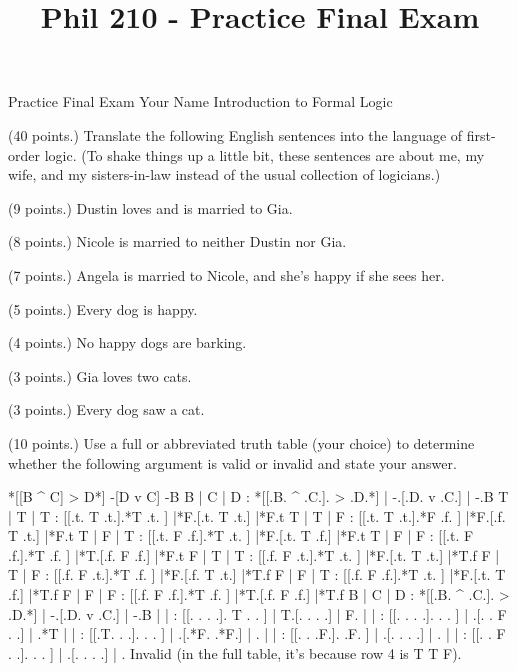 
\title{Phil 210 - Practice Final Exam}

\heading
Practice Final Exam
Your Name
Introduction to Formal Logic
\endheading

(40 points.) Translate the following English sentences into the language of first-order logic. (To shake things up a little bit, these sentences are about me, my wife, and my sisters-in-law instead of the usual collection of logicians.)

\quantifiers
\problems
{} (9 points.)
Dustin loves and is married to Gia.
	\answer
	$ $
	\endanswer

 (8 points.)
Nicole is married to neither Dustin nor Gia.
	\answer
	$ $
	\endanswer

 (7 points.)
Angela is married to Nicole, and she's happy if she sees her.
	\answer
	$ $
	\endanswer

 (5 points.)
Every dog is happy.
	\answer
	$ $
	\endanswer

 (4 points.)
No happy dogs are barking.
	\answer
	$ $
	\endanswer

 (3 points.)
Gia loves two cats.
	\answer
	$ $
	\endanswer

 (3 points.)
Every dog saw a cat.
	\answer
	$ $
	\endanswer

\endproblems

(10 points.) Use a full or abbreviated truth table (your choice) to determine whether the following argument is valid or invalid and state your answer.

\problems
{}
\argument
 *[[B ^ C] > D*]
 -[D v C]
\argumentline
 -B
\endargument
	\answer
	\truthtable
	 B | C | D : *[[.B. ^ .C.]. > .D.*] | -.[.D. v .C.] | -.B
	\truthtableline
	 T | T | T :  [[.t. T .t.].*T .t. ] |*F.[.t. T .t.] |*F.t
	 T | T | F :  [[.t. T .t.].*F .f. ] |*F.[.f. T .t.] |*F.t
	 T | F | T :  [[.t. F .f.].*T .t. ] |*F.[.t. T .f.] |*F.t
	 T | F | F :  [[.t. F .f.].*T .f. ] |*T.[.f. F .f.] |*F.t
	 F | T | T :  [[.f. F .t.].*T .t. ] |*F.[.t. T .t.] |*T.f
	 F | T | F :  [[.f. F .t.].*T .f. ] |*F.[.f. T .t.] |*T.f
	 F | F | T :  [[.f. F .f.].*T .t. ] |*F.[.t. T .f.] |*T.f
	 F | F | F :  [[.f. F .f.].*T .f. ] |*T.[.f. F .f.] |*T.f
	\endtruthtable
	\truthtable
	 B | C | D : *[[.B. ^ .C.]. > .D.*] | -.[.D. v .C.] | -.B
	\truthtableline
	   |   |   :  [[. .   . .]. T . . ] | T.[. .   . .] | F. 
	   |   |   :  [[. .   . .].   . . ] |  .[. . F . .] |  .*T
	   |   |   :  [[.T.   . .].   . . ] |  .[.*F. .*F.] |  . 
	   |   |   :  [[. .   .F.].   .F. ] |  .[. .   . .] |  . 
	   |   |   :  [[. . F . .].   . . ] |  .[. .   . .] |  . 
	\endtruthtable
	Invalid (in the full table, it's because row 4 is T T F).
	\endanswer

